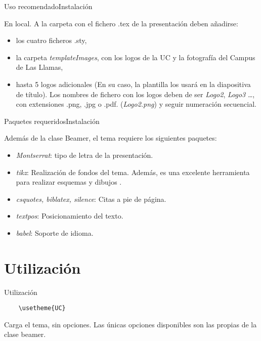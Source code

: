 \documentclass[handout,%
		aspectratio=43,%
		9pt]{beamer}
\begin{document}
\begin{frame}{Uso recomendado}{Instalación}

En local. A la carpeta con el fichero .tex de la presentación deben añadirse:

\begin{itemize}
\item los cuatro ficheros .sty,
\item la carpeta \textit{templateImages}, con los logos de la UC y la fotografía del Campus de Las Llamas,
\item hasta 5 logos adicionales (En su caso, la plantilla los usará en la diapositiva de título). Los nombres de fichero con los logos deben de ser \textit{Logo2}, \textit{Logo3} \ldots, con extensiones .png, .jpg o .pdf. (\textit{Logo2.png}) y seguir numeración secuencial.
\end{itemize}
\end{frame}

\begin{frame}{Paquetes requeridos}{Instalación}

Además de la clase Beamer, el tema requiere los siguientes paquetes: 

\begin{itemize}
\item \textit{Montserrat}: tipo de letra de la presentación.
\item \textit{tikz}: Realización de fondos del tema. Además, es una excelente herramienta para realizar esquemas y dibujos .
\item \textit{csquotes, biblatex, silence}: Citas a pie de página.
\item \textit{textpos}: Posicionamiento del texto. 
\item \textit{babel}: Soporte de idioma.
\end{itemize}

\end{frame}

\section{Utilización}
\begin{frame}[fragile]{Utilización}

\begin{verbatim}
	\usetheme{UC}
\end{verbatim}
Carga el tema, sin opciones. Las únicas opciones disponibles son las propias de la clase beamer.


\end{frame}
\end{document}
